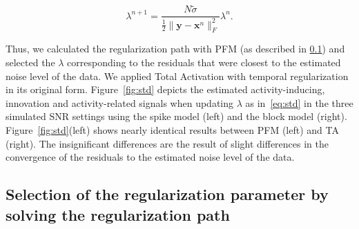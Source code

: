 \begin{equation}
    \lambda^{n+1} = \frac{N \tilde{\sigma}}{\frac{1}{2} \| \mathbf{y} - \mathbf{x}^n \|_F^2} \lambda^n.
\label{eq:std}
\end{equation}

Thus, we calculated the regularization path with PFM (as described in \ref{sec:regpath}) and selected the \(\lambda\) corresponding to the residuals that were closest to the estimated noise level of the data. We applied Total Activation with temporal regularization in its original form. Figure~\ref{fig:std} depicts the estimated activity-inducing, innovation and activity-related signals when updating \(\lambda\) as in~\eqref{eq:std} in the three simulated SNR settings using the spike model (left) and the block model (right). Figure~\ref{fig:std}(left) shows nearly identical results between PFM (left) and TA (right). The insignificant differences are the result of slight differences in the convergence of the residuals to the estimated noise level of the data.

\subsection{Selection of the regularization parameter by solving the regularization path}
\label{sec:regpath}

